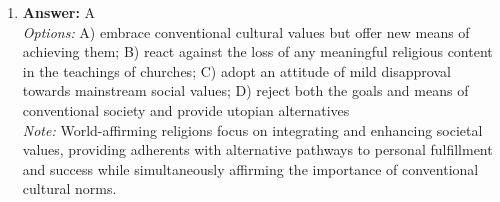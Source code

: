\documentclass[12pt]{article}
\begin{document}
\begin{enumerate}[label=\arabic*.]
\\ \textit{Note:} The correct answer is that these religious organizations are monotheistic because they all believe in the existence of a single, all-powerful deity, which is a fundamental characteristic of monotheistic faiths.
\item \textbf{Answer:} A
\\ \textit{Options:} A) embrace conventional cultural values but offer new means of achieving them; B) react against the loss of any meaningful religious content in the teachings of churches; C) adopt an attitude of mild disapproval towards mainstream social values; D) reject both the goals and means of conventional society and provide utopian alternatives
\\ \textit{Note:} World-affirming religions focus on integrating and enhancing societal values, providing adherents with alternative pathways to personal fulfillment and success while simultaneously affirming the importance of conventional cultural norms.
\end{enumerate}
\end{document}
